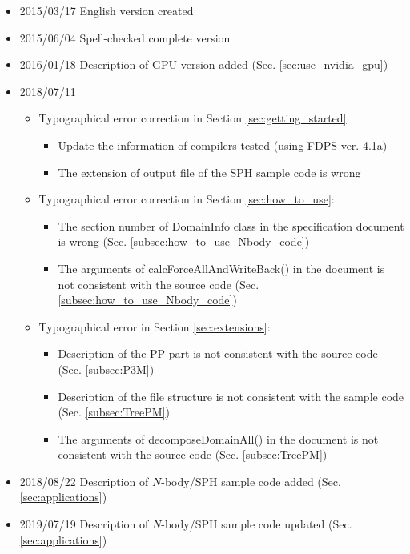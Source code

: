 \begin{itemize}
\item 2015/03/17 English version created
\item 2015/06/04 Spell-checked complete version
\item 2016/01/18 Description of GPU version added (Sec. \ref{sec:use_nvidia_gpu})
\item 2018/07/11
  \begin{itemize}
  \item Typographical error correction in Section \ref{sec:getting_started}:
    \begin{itemize}
    \item Update the information of compilers tested (using FDPS ver. 4.1a)
    \item The extension of output file of the SPH sample code is wrong
    \end{itemize}
  \item Typographical error correction in Section \ref{sec:how_to_use}:
    \begin{itemize}
    \item The section number of DomainInfo class in the specification document is wrong (Sec. \ref{subsec:how_to_use_Nbody_code})
    \item The arguments of calcForceAllAndWriteBack() in the document is not consistent with the source code (Sec. \ref{subsec:how_to_use_Nbody_code})
    \end{itemize}
  \item Typographical error in Section \ref{sec:extensions}:
    \begin{itemize}
    \item Description of the PP part is not consistent with the source code (Sec. \ref{subsec:P3M})
    \item Description of the file structure is not consistent with the sample code (Sec. \ref{subsec:TreePM})
    \item The arguments of decomposeDomainAll() in the document is not consistent with the source code (Sec. \ref{subsec:TreePM})
    \end{itemize}
  \end{itemize}
\item 2018/08/22 Description of $N$-body/SPH sample code added (Sec. \ref{sec:applications})
\item 2019/07/19 Description of $N$-body/SPH sample code updated (Sec. \ref{sec:applications})
\end{itemize} 

